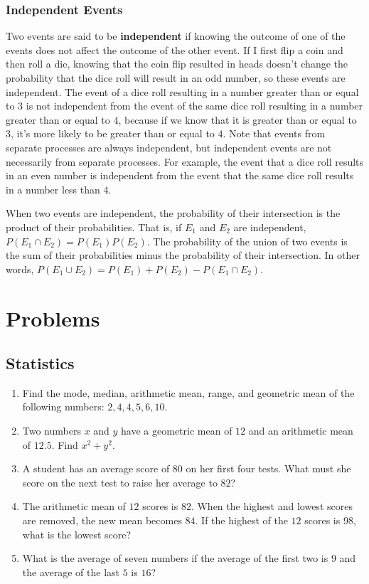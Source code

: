 \documentclass[twocolumn]{article}
\begin{document}
\subsubsection*{Independent Events}
Two events are said to be \textbf{independent} if knowing the outcome of one
of the events does not affect the outcome of the other event. If I first
flip a coin and then roll a die, knowing that the coin flip resulted in
heads doesn't change the probability that the dice roll will result in an
odd number, so these events are independent. The event of a dice roll
resulting in a number greater than or equal to $3$ is not independent from
the event of the same dice roll resulting in a number greater than or equal
to $4$, because if we know that it is greater than or equal to $3$, it's
more likely to be greater than or equal to $4$. Note that events from
separate processes are always independent, but independent events are not
necessarily from separate processes. For example, the event that a dice roll
results in an even number is independent from the event that the same dice
roll results in a number less than $4$.

When two events are independent, the probability of their intersection is
the product of their probabilities. That is, if $E_1$ and $E_2$ are
independent, $P(E_1 \cap E_2) = P(E_1)P(E_2)$. The probability of the union
of two events is the sum of their probabilities minus the probability of
their intersection. In other words, $P(E_1 \cup E_2) = P(E_1) + P(E_2) -
P(E_1 \cap E_2)$.

\section*{Problems}

\subsection*{Statistics}
\begin{enumerate}
	\item Find the mode, median, arithmetic mean, range, and geometric mean
		of the following numbers: $2, 4, 4, 5, 6, 10$.
		\vspace{3cm}
	\item Two numbers $x$ and $y$ have a geometric mean of $12$ and an
		arithmetic mean of $12.5$. Find $x^2 + y^2$.
		\vspace{3cm}
	\item A student has an average score of $80$ on her first four tests.
		What must she score on the next test to raise her average to $82$?
		\vspace{3cm}
	\item The arithmetic mean of $12$ scores is $82$. When the highest and
		lowest scores are removed, the new mean becomes $84$. If the highest
		of the $12$ scores is $98$, what is the lowest score?
		\vspace{3cm}
	\item What is the average of seven numbers if the average of the first
		two is $9$ and the average of the last $5$ is $16$?
		\vspace{3cm}
\end{enumerate}
\end{document}
